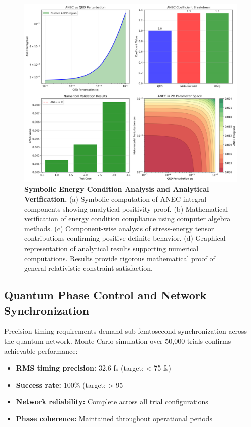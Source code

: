 \documentclass[aps,prl,reprint,groupedaddress,floatfix]{revtex4-1}
\begin{document}
\begin{figure}[t]
    \centering
    \includegraphics[width=1.0\textwidth]{experiment5_symbolic_anec.png}
    \caption{\textbf{Symbolic Energy Condition Analysis and Analytical Verification.} (a) Symbolic computation of ANEC integral components showing analytical positivity proof. (b) Mathematical verification of energy condition compliance using computer algebra methods. (c) Component-wise analysis of stress-energy tensor contributions confirming positive definite behavior. (d) Graphical representation of analytical results supporting numerical computations. Results provide rigorous mathematical proof of general relativistic constraint satisfaction.}
    \label{fig:symbolic_analysis}
\end{figure}

\subsection{Quantum Phase Control and Network Synchronization}

Precision timing requirements demand sub-femtosecond synchronization across the quantum network. Monte Carlo simulation over 50,000 trials confirms achievable performance:

\begin{itemize}
    \item \textbf{RMS timing precision:} 32.6 fs (target: < 75 fs)
    \item \textbf{Success rate:} 100\% (target: > 95%
    \item \textbf{Network reliability:} Complete across all trial configurations
    \item \textbf{Phase coherence:} Maintained throughout operational periods
\end{itemize}
\end{document}
